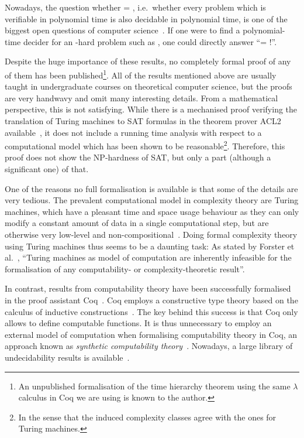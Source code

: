 Nowadays, the question whether \PC{} = \NP{}, i.e.\ whether every problem which is verifiable in polynomial time is also decidable in polynomial time, is one of the biggest open questions of computer science~\cite{claymath}. 
If one were to find a polynomial-time decider for an \NP{}-hard problem such as \SAT{}, one could directly answer ``\PC{}= \NP{}!''.

Despite the huge importance of these results, no completely formal proof of any of them has been published\footnote{An unpublished formalisation of the time hierarchy theorem using the same $\lambda$ calculus in Coq we are using is known to the author.}. 
All of the results mentioned above are usually taught in undergraduate courses on theoretical computer science, but the proofs are very handwavy and omit many interesting details. From a mathematical perspective, this is not satisfying.
While there is a mechanised proof verifying the translation of Turing machines to SAT formulas in the theorem prover ACL2 available~\cite{gamboa:cook}, it does not include a running time analysis with respect to a computational model which has been shown to be reasonable\footnote{In the sense that the induced complexity classes agree with the ones for Turing machines.}. Therefore, this proof does not show the NP-hardness of SAT, but only a part (although a significant one) of that.

One of the reasons no full formalisation is available is that some of the details are very tedious. The prevalent computational model in complexity theory are Turing machines, which have a pleasant time and space usage behaviour as they can only modify a constant amount of data in a single computational step, but are otherwise very low-level and non-compositional~\cite{ForsterEtAl:2019:VerifiedTMs}.
Doing formal complexity theory using Turing machines thus seems to be a daunting task: As stated by Forster et al.~\cite{ForsterEtAl:2019:VerifiedTMs}, ``Turing machines as model of computation are inherently infeasible for the formalisation of any computability- or complexity-theoretic result''. 

In contrast, results from computability theory have been successfully formalised in the proof assistant Coq~\cite{coqweb}. 
Coq employs a constructive type theory based on the calculus of inductive constructions~\cite{iclnotes}. The key behind this success is that Coq only allows to define computable functions. 
It is thus unnecessary to employ an external model of computation when formalising computability theory in Coq, an approach known as \textit{synthetic computability theory}~\cite{ForsterEtAl:2018:On-Synthetic-Undecidability}. 
Nowadays, a large library of undecidability results is available~\cite{coq_undec}. 

